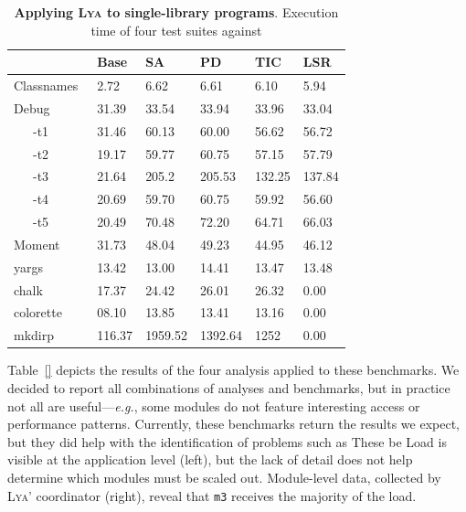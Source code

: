 \documentclass[letterpaper,twocolumn,10pt]{article}
\def\eg{{\em e.g.}, }
\newcommand{\ttt}[1]{\texttt{#1}}
\newcommand{\sys}{{\scshape Lya}\xspace}
\newcommand{\fixme}[1]{{\color{red}#1}}
\begin{document}
\begin{table}[t]
\center
\footnotesize
\setlength\tabcolsep{3pt}
\caption{
  \footnotesize{
    \textbf{Applying \sys to single-library programs}.
		\fixme{Execution time of four test suites against }
  }
}
\begin{tabular*}{\columnwidth}{l @{\extracolsep{\fill}} ll lll}
\toprule
                    & Base   &  SA   & PD     &   TIC   & LSR     \\
\midrule
Classnames~\cite{}  &  2.72  & 6.62  &  6.61  &  6.10   & 5.94    \\
Debug~\cite{}       & 31.39  & 33.54 &  33.94 &  33.96  & 33.04   \\
~~~-t1              & 31.46  & 60.13 &  60.00 &  56.62  & 56.72   \\
~~~-t2              & 19.17  & 59.77 &  60.75 &  57.15  & 57.79   \\
~~~-t3              & 21.64  & 205.2 &  205.53&  132.25 & 137.84  \\
~~~-t4              & 20.69  & 59.70 &  60.75 &  59.92  & 56.60   \\
~~~-t5              & 20.49  & 70.48 &  72.20 &  64.71  & 66.03   \\
Moment~\cite{}      & 31.73  & 48.04 &  49.23 &  44.95  & 46.12   \\
yargs~\cite{}       & 13.42  & 13.00 &  14.41 &  13.47  & 13.48   \\
chalk~\cite{} 	    & 17.37  & 24.42 &  26.01 &  26.32  & 0.00    \\
colorette~\cite{}   & 08.10  & 13.85 &  13.41 &  13.16  & 0.00    \\
mkdirp~\cite{}      & 116.37 & 1959.52 & 1392.64 & 1252 & 0.00    \\
\bottomrule
\end{tabular*}
\label{tab:meso}
\vspace{-5mm}
\end{table}


Table~\ref{} depicts the results of the four analysis applied to these benchmarks.
We decided to report all combinations of analyses and benchmarks, but in practice not all are useful---\eg some modules do not feature interesting access or performance patterns.
Currently, these benchmarks return the results we expect, but they did help with the identification of problems such as 
These be
Load is visible at the application level (left), but the lack of detail does not help determine which modules must be scaled out.
Module-level data, collected by \sys' coordinator (right), reveal that \ttt{m3} receives the majority of the load.
\end{document}
